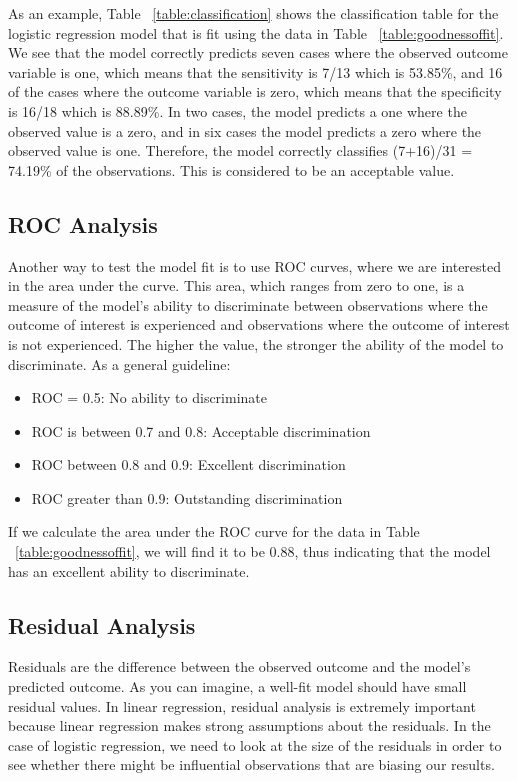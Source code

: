 \documentclass[a4paper,12pt,oneside]{book}
\begin{document}
As an example, Table ~\ref{table:classification} shows the classification table for the logistic regression model that is fit using the data in Table ~\ref{table:goodnessoffit}. We see that the model correctly predicts seven cases where the observed outcome variable is one, 
which means that the sensitivity is 7/13 which is 53.85\%, and 16 of the cases where the outcome variable is zero, which means that the specificity is 16/18 which is 88.89\%. In two cases, the model predicts a one where the 
observed value is a zero, and in six cases the model predicts a zero where the observed value is one. Therefore, the model correctly classifies (7+16)/31 = 74.19\% of the observations. This is considered to be an acceptable 
value.
\subsection{ROC Analysis}
Another way to test the model fit is to use ROC curves, where we are interested in the area under the curve. This area, which ranges from zero to one, is a measure of the model’s ability to discriminate between 
observations where the outcome of interest is experienced and observations where the outcome of interest is not experienced. The higher the value, the stronger the ability of the model to discriminate. As a general 
guideline:
\begin{itemize}
	\item ROC = 0.5: No ability to discriminate
	\item ROC is between 0.7 and 0.8: Acceptable discrimination
	\item ROC between 0.8 and 0.9: Excellent discrimination
	\item ROC greater than 0.9: Outstanding discrimination
\end{itemize}
If we calculate the area under the ROC curve for the data in Table ~\ref{table:goodnessoffit}, we will find it to be 0.88, thus indicating that the model has an excellent ability to discriminate.
\subsection{Residual Analysis}
Residuals are the difference between the observed outcome and the model’s predicted outcome. As you can imagine, a well-fit model should have small residual values. In linear regression, residual analysis is extremely 
important because linear regression makes strong assumptions about the residuals. In the case of logistic regression, we need to look at the size of the residuals in order to see whether there might be influential 
observations that are biasing our results. 
\end{document}
